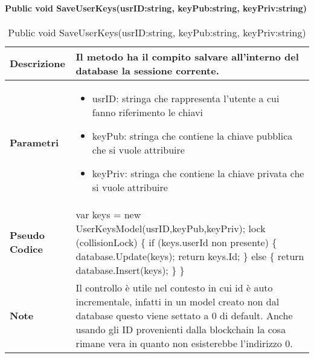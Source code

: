 \paragraph{Public void SaveUserKeys(usrID:string, keyPub:string, keyPriv:string)}
\begin{center}
    \begin{longtable}{|p{3cm}|p{9cm}|}%
    \caption{Public void SaveUserKeys(usrID:string, keyPub:string, keyPriv:string)}
    \label{tab:public-void-SaveUserKeys}
    \endfirsthead
    \endhead
    \hline
    \textbf{Descrizione} & Il metodo ha il compito salvare all’interno del database la sessione corrente.\\
    \hline
    \textbf{Parametri} &      
    \begin{itemize}
        \item usrID: stringa che rappresenta l’utente a cui fanno riferimento le chiavi
        \item keyPub: stringa che contiene la chiave pubblica che si vuole attribuire
        \item keyPriv: stringa che contiene la chiave privata che si vuole attribuire
    \end{itemize}
    \\
    \hline
    \textbf{Pseudo Codice} & 
    var keys = new UserKeysModel(usrID,keyPub,keyPriv);\newline
    lock (collisionLock)\newline
    \{\newline
        if (keys.userId non presente)\newline
        \{\newline
            database.Update(keys);\newline
            return keys.Id;\newline
        \}\newline
        else\newline
        \{\newline
            return database.Insert(keys);\newline
        \}\newline
    \}\newline
    \\
    \hline
    \textbf{Note} & 
    Il controllo è utile nel contesto in cui id è auto incrementale, infatti in un model creato non dal database questo viene settato a 0 di default. Anche usando gli ID provenienti dalla blockchain la cosa rimane vera in quanto non esisterebbe l’indirizzo 0.
    \\
    \hline
    \end{longtable}
    \end{center}





